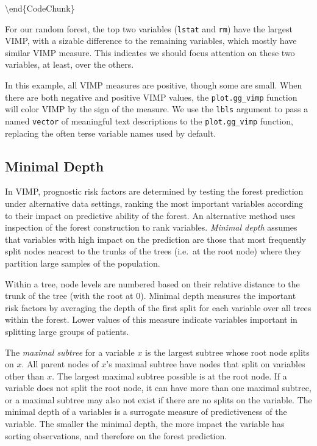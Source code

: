 \documentclass[article]{jss}
\begin{document}
\textbackslash{}end\{CodeChunk\}

For our random forest, the top two variables (\texttt{lstat} and
\texttt{rm}) have the largest VIMP, with a sizable difference to the
remaining variables, which mostly have similar VIMP measure. This
indicates we should focus attention on these two variables, at least,
over the others.

In this example, all VIMP measures are positive, though some are small.
When there are both negative and positive VIMP values, the
\texttt{plot.gg\_vimp} function will color VIMP by the sign of the
measure. We use the \texttt{lbls} argument to pass a named
\texttt{vector} of meaningful text descriptions to the
\texttt{plot.gg\_vimp} function, replacing the often terse variable
names used by default.

\hypertarget{minimal-depth}{%
\subsection{Minimal Depth}\label{minimal-depth}}

In VIMP, prognostic risk factors are determined by testing the forest
prediction under alternative data settings, ranking the most important
variables according to their impact on predictive ability of the forest.
An alternative method uses inspection of the forest construction to rank
variables. \emph{Minimal depth} assumes that variables with high impact
on the prediction are those that most frequently split nodes nearest to
the trunks of the trees (i.e.~at the root node) where they partition
large samples of the population.

Within a tree, node levels are numbered based on their relative distance
to the trunk of the tree (with the root at 0). Minimal depth measures
the important risk factors by averaging the depth of the first split for
each variable over all trees within the forest. Lower values of this
measure indicate variables important in splitting large groups of
patients.

The \emph{maximal subtree} for a variable \(x\) is the largest subtree
whose root node splits on \(x\). All parent nodes of \(x\)'s maximal
subtree have nodes that split on variables other than \(x\). The largest
maximal subtree possible is at the root node. If a variable does not
split the root node, it can have more than one maximal subtree, or a
maximal subtree may also not exist if there are no splits on the
variable. The minimal depth of a variables is a surrogate measure of
predictiveness of the variable. The smaller the minimal depth, the more
impact the variable has sorting observations, and therefore on the
forest prediction.
\end{document}
